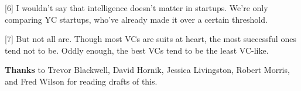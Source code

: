 [6] I wouldn't say that intelligence doesn't matter in
                  startups. We're only comparing YC startups, who've already
                  made it over a certain threshold.

[7] But not all are. Though most VCs are suits at heart, the
                  most successful ones tend not to be. Oddly enough, the best
                  VCs tend to be the least VC-like.


                  \textbf{Thanks} to Trevor Blackwell, David Hornik, Jessica
                  Livingston, Robert Morris, and Fred Wilson for reading drafts
                  of this.


              
            
          
